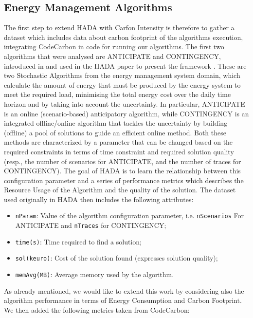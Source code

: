 \documentclass[a4paper,singleside,12pt]{report} %
\begin{document}
\subsection{Energy Management Algorithms}

The first step to extend HADA with Carfon Intensity is therefore to gather a dataset which includes data about carbon footprint 
of the algorithms execution, integrating CodeCarbon in code for running our algorithms. The first two algorithms that were analysed 
are ANTICIPATE and CONTINGENCY, introduced in \cite{ijcai2019p150} \cite{10.1007/978-3-319-93031-2_8} and used in the HADA paper to present the framework \cite{DEFILIPPO2022109199}.
These are two Stochastic Algorithms from the energy management system domain, which calculate the amount of energy that must be 
produced by the energy system to meet the required load, minimising the total energy cost over the daily time horizon and by taking 
into account the uncertainty. In particular, ANTICIPATE is an online (scenario-based) anticipatory algorithm, while CONTINGENCY 
is an integrated offline/online algorithm that tackles the uncertainty by building (offline) a pool of solutions to guide an 
efficient online method. Both these methods are characterized by a parameter that can be changed based on the required constraints
in terms of time constraint and required solution quality (resp., the number of scenarios for ANTICIPATE, and the number of traces 
for CONTINGENCY). The goal of HADA is to learn the relationship between this configuration parameter and a series of performance
metrics which describes the Resource Usage of the Algorithm and the quality of the solution. The dataset used originally in HADA then
includes the following attributes:

\begin{itemize}
    \item \verb|nParam|: Value of the algorithm configuration parameter, i.e. \verb|nScenarios| For ANTICIPATE and \verb|nTraces| for CONTINGENCY;
    \item \verb|time(s)|: Time required to find a solution;
    \item \verb|sol(keuro)|: Cost of the solution found (expresses solution quality);
    \item \verb|memAvg(MB)|: Average memory used by the algorithm.
\end{itemize}

As already mentioned, we would like to extend this work by considering also the algorithm performance in terms of Energy Consumption and
Carbon Footprint. We then added the following metrics taken from CodeCarbon:
\end{document}
